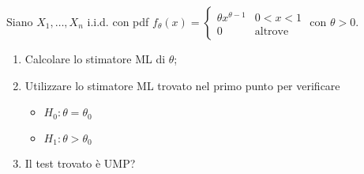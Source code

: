 \documentclass[hidelinks, 10pt]{report}
\begin{document}
\begin{ex}
Siano $ X_{1}, \dotsc, X_{n} $ i.i.d. con pdf $ f_{\theta} (x) = \begin{cases} \theta x^{\theta - 1} & 0 < x < 1 \\ 0 & \text{altrove} \end{cases} $ con $ \theta > 0 $.
\begin{enumerate}
\item Calcolare lo stimatore ML di $ \theta $;
\item Utilizzare lo stimatore ML trovato nel primo punto per verificare
\begin{itemize}
\item $ H_{0} : \theta = \theta_{0} $
\item $ H_{1} : \theta > \theta_{0} $
\end{itemize}
\item Il test trovato \`e UMP?
\end{enumerate}
\end{ex}
\end{document}
